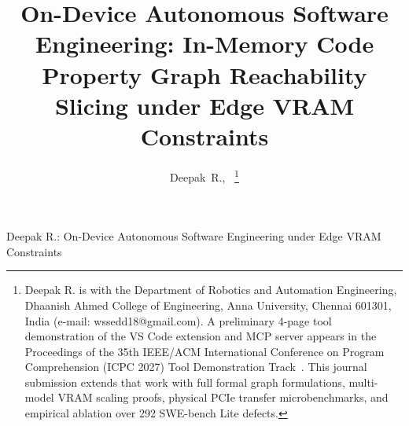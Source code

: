 \documentclass[journal]{IEEEtran}
\begin{document}
\title{On-Device Autonomous Software Engineering: In-Memory Code Property Graph Reachability Slicing under Edge VRAM Constraints}

\author{Deepak~R.,~%
\thanks{Deepak R. is with the Department of Robotics and Automation Engineering, Dhaanish Ahmed College of Engineering, Anna University, Chennai 601301, India (e-mail: wssedd18@gmail.com). A preliminary 4-page tool demonstration of the VS Code extension and MCP server appears in the Proceedings of the 35th IEEE/ACM International Conference on Program Comprehension (ICPC 2027) Tool Demonstration Track~\cite{deepak2027neurocode_demo}. This journal submission extends that work with full formal graph formulations, multi-model VRAM scaling proofs, physical PCIe transfer microbenchmarks, and empirical ablation over 292 SWE-bench Lite defects.}%
}

%
{Deepak R.: On-Device Autonomous Software Engineering under Edge VRAM Constraints}

\maketitle
\end{document}
